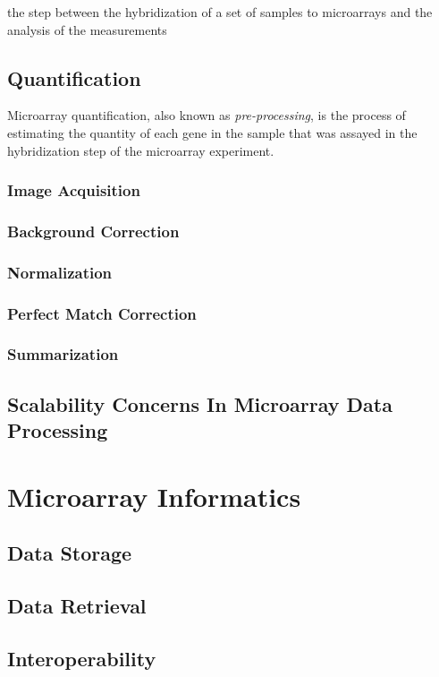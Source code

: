 {the step between the hybridization of a set of samples to microarrays and the analysis of the measurements

\subsection{Quantification}

Microarray quantification, also known as \emph{pre-processing}, is the
process of estimating the quantity of each gene in the sample that was assayed
in the hybridization step of the microarray experiment.

\subsubsection{Image Acquisition}
\subsubsection{Background Correction}
\subsubsection{Normalization}
\subsubsection{Perfect Match Correction}
\subsubsection{Summarization}
\subsection{Scalability Concerns In Microarray Data Processing}

\section{Microarray Informatics}
\subsection{Data Storage}
\subsection{Data Retrieval}
\subsection{Interoperability}
}
